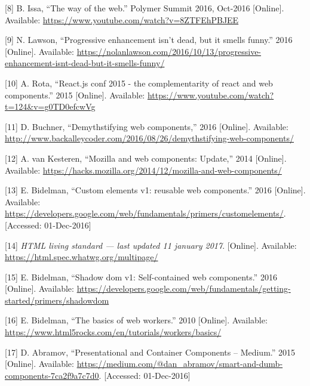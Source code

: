 \documentclass[]{article}
\begin{document}
\hypertarget{ref-Issa2016}{}
{[}8{]} B. Issa, ``The way of the web.'' Polymer Summit 2016, Oct-2016
{[}Online{]}. Available:
\url{https://www.youtube.com/watch?v=8ZTFEhPBJEE}

\hypertarget{ref-Lawson2016}{}
{[}9{]} N. Lawson, ``Progressive enhancement isn't dead, but it smells
funny.'' 2016 {[}Online{]}. Available:
\url{https://nolanlawson.com/2016/10/13/progressive-enhancement-isnt-dead-but-it-smells-funny/}

\hypertarget{ref-Rota2015}{}
{[}10{]} A. Rota, ``React.js conf 2015 - the complementarity of react
and web components.'' 2015 {[}Online{]}. Available:
\url{https://www.youtube.com/watch?t=124\&v=g0TD0efcwVg}

\hypertarget{ref-Buchner2016}{}
{[}11{]} D. Buchner, ``Demythstifying web components,'' 2016
{[}Online{]}. Available:
\url{http://www.backalleycoder.com/2016/08/26/demythstifying-web-components/}

\hypertarget{ref-vanKesteren2014}{}
{[}12{]} A. van Kesteren, ``Mozilla and web components: Update,'' 2014
{[}Online{]}. Available:
\url{https://hacks.mozilla.org/2014/12/mozilla-and-web-components/}

\hypertarget{ref-Bidelman2016}{}
{[}13{]} E. Bidelman, ``Custom elements v1: reusable web components.''
2016 {[}Online{]}. Available:
\url{https://developers.google.com/web/fundamentals/primers/customelements/}.
{[}Accessed: 01-Dec-2016{]}

\hypertarget{ref-HTML}{}
{[}14{]} \emph{HTML living standard --- last updated 11 january 2017}.
{[}Online{]}. Available: \url{https://html.spec.whatwg.org/multipage/}

\hypertarget{ref-Bidelman2016shadow}{}
{[}15{]} E. Bidelman, ``Shadow dom v1: Self-contained web components.''
2016 {[}Online{]}. Available:
\url{https://developers.google.com/web/fundamentals/getting-started/primers/shadowdom}

\hypertarget{ref-Bidelman2010}{}
{[}16{]} E. Bidelman, ``The basics of web workers.'' 2010 {[}Online{]}.
Available: \url{https://www.html5rocks.com/en/tutorials/workers/basics/}

\hypertarget{ref-Abramov2015}{}
{[}17{]} D. Abramov, ``Presentational and Container Components --
Medium.'' 2015 {[}Online{]}. Available:
\url{https://medium.com/@dan_abramov/smart-and-dumb-components-7ca2f9a7c7d0}.
{[}Accessed: 01-Dec-2016{]}
\end{document}
